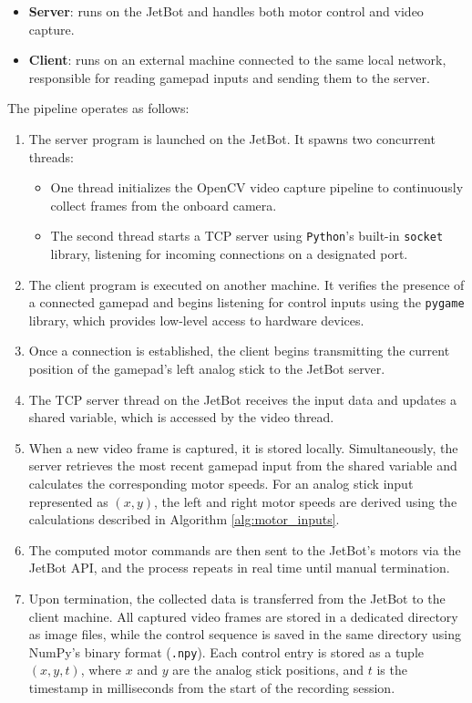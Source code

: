 \begin{itemize}
  \item \textbf{Server}: runs on the JetBot and handles both motor control and video capture.
  \item \textbf{Client}: runs on an external machine connected to the same local network, responsible for reading gamepad inputs and sending them to the server.
\end{itemize}

The pipeline operates as follows:

\begin{enumerate}
  \item The server program is launched on the JetBot. It spawns two concurrent threads:
    \begin{itemize}
      \item One thread initializes the OpenCV video capture pipeline to continuously collect frames from the onboard camera.
      \item The second thread starts a TCP server using \texttt{Python}’s built-in \texttt{socket} library, listening for incoming connections on a designated port.
    \end{itemize}

  \item The client program is executed on another machine. It verifies the presence of a connected gamepad and begins listening for control inputs using the \texttt{pygame} library, which provides low-level access to hardware devices.

  \item Once a connection is established, the client begins transmitting the current position of the gamepad’s left analog stick to the JetBot server.

  \item The TCP server thread on the JetBot receives the input data and updates a shared variable, which is accessed by the video thread.

  \item When a new video frame is captured, it is stored locally. Simultaneously, the server retrieves the most recent gamepad input from the shared variable and calculates the corresponding motor speeds. For an analog stick input represented as \( (x, y) \), the left and right motor speeds are derived using the calculations described in Algorithm \ref{alg:motor_inputs}.

  \item The computed motor commands are then sent to the JetBot’s motors via the JetBot API, and the process repeats in real time until manual termination.

  \item Upon termination, the collected data is transferred from the JetBot to the client machine. All captured video frames are stored in a dedicated directory as image files, while the control sequence is saved in the same directory using NumPy's binary format (\texttt{.npy}). Each control entry is stored as a tuple \( (x, y, t) \), where \( x \) and \( y \) are the analog stick positions, and \( t \) is the timestamp in milliseconds from the start of the recording session.
\end{enumerate}

